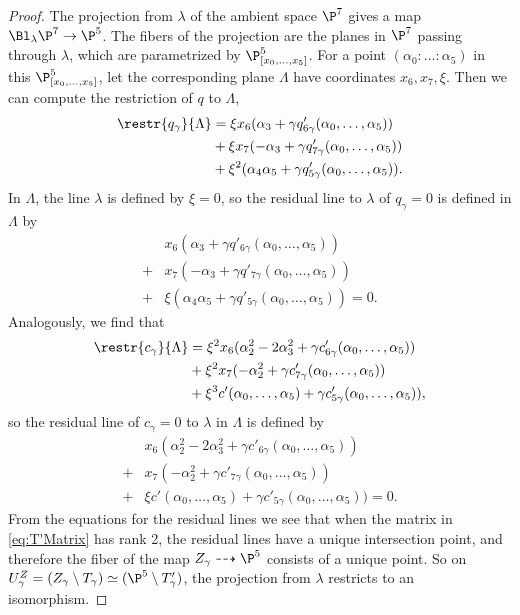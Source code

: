 \begin{proof}
  The projection from $\lambda$ of the ambient space $\P^7$ gives a map $\Bl_{\lambda}\P^7 \to \P^5$. The fibers of the projection are the planes in $\P^7$ passing through $\lambda$, which are parametrized by $\P^5_{[x_0,\dots,x_5]}$. For a point $(\alpha_0:\dots:\alpha_5)$ in this $\P^5_{[x_0,\dots,x_5]}$, let the corresponding plane $\Lambda$ have coordinates $x_6,x_7,\xi$. Then we can compute the restriction of $q$ to $\Lambda$,
  \begin{align*}
  \restr{q_{\gamma}}{\Lambda} &= \xi x_6 (\alpha_3 + \gamma q'_{6 \gamma}(\alpha_0,\dots,\alpha_5))\\
    &+ \xi x_7(-\alpha_3 + \gamma q'_{7\gamma}(\alpha_0,\dots,\alpha_5))\\
    &+ \xi^2(\alpha_4\alpha_5 + \gamma q'_{5\gamma}(\alpha_0,\dots,\alpha_5)).
  \end{align*}
In $\Lambda$, the line $\lambda$ is defined by $\xi = 0$, so the residual line to $\lambda$ of $q_\gamma = 0$ is defined in $\Lambda$ by
\begin{align*}
  &x_6 (\alpha_3 + \gamma q'_{6 \gamma}(\alpha_0,\dots,\alpha_5))\\
 +&x_7(-\alpha_3 + \gamma q'_{7\gamma}(\alpha_0,\dots,\alpha_5))\\
 +&\xi(\alpha_4\alpha_5 + \gamma q'_{5\gamma}(\alpha_0,\dots,\alpha_5)) = 0.
\end{align*}
Analogously, we find that
\begin{align*}
	\restr{c_{\gamma}}{\Lambda} &= \xi^2 x_6(\alpha_2^2 - 2\alpha_3^2 + \gamma c'_{6\gamma}(\alpha_0,\dots,\alpha_5))
	\\ &+ \xi^2 x_7(-\alpha_2^2 + \gamma c'_{7\gamma}(\alpha_0,\dots,\alpha_5))
	\\ &+ \xi^3c'(\alpha_0,\dots,\alpha_5) + \gamma c'_{5\gamma}(\alpha_0,\dots,\alpha_5)),
\end{align*}
so the residual line of $c_\gamma = 0$ to $\lambda$ in $\Lambda$ is defined by
\begin{align*}
	&x_6(\alpha_2^2 - 2\alpha_3^2 + \gamma c'_{6\gamma}(\alpha_0,\dots,\alpha_5)) \\
	+ &x_7(-\alpha_2^2 + \gamma c'_{7\gamma}(\alpha_0,\dots,\alpha_5))\\
	+ &\xi c'(\alpha_0,\dots,\alpha_5) + \gamma c'_{5\gamma}(\alpha_0,\dots,\alpha_5))= 0.	
\end{align*}
From the equations for the residual lines we see that when the matrix in \eqref{eq:T'Matrix} has rank 2, the residual lines have a unique intersection point, and therefore the fiber of the map $Z_\gamma \dashrightarrow \P^5$ consists of a unique point. So on $U^Z_\gamma = (Z_\gamma \setminus T_\gamma) \simeq (\P^5 \setminus T'_\gamma)$, the projection from $\lambda$ restricts to an isomorphism.


\end{proof}
